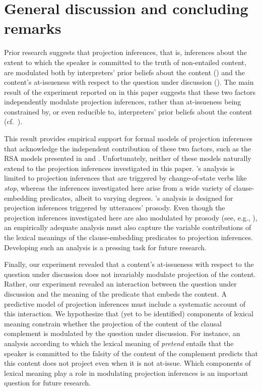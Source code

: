 \documentclass[11pt,fleqn]{article}
\newcommand{\6}{\mbox{$[\hspace*{-.6mm}[$}}
\newcommand{\9}{\mbox{$]\hspace*{-.6mm}]$}}
\newcommand{\citepos}[1]{\citeauthor{#1}'s \citeyear{#1}}
\begin{document}
\section{General discussion and concluding remarks}\label{s-disc}

Prior research suggests that projection inferences, that is, inferences about the extent to which the speaker is committed to the truth of non-entailed content, are modulated both by interpreters' prior beliefs about the content (\citealt{degen-tonhauser-openmind}) and the content's at-issueness with respect to the question under discussion (\citealt{tbd-variability}). The main result of the experiment reported on in this paper suggests that these two factors independently modulate projection inferences, rather than at-issueness being constrained by, or even reducible to, interpreters' prior beliefs about the content (cf.\ \citealt{tonhauser-etal-eval}). 

This result provides empirical support for formal models of projection inferences that acknowledge the independent contribution of these two factors, such as the RSA models presented in \citealt{qing-etal2016} and \citealt{stevens-etal2017}. Unfortunately, neither of these models naturally extend to the projection inferences investigated in this paper. \citepos{qing-etal2016} analysis is limited to projection inferences that are triggered by change-of-state verbs like \emph{stop}, whereas the inferences investigated here arise from a wide variety of clause-embedding predicates, albeit to varying degrees. \citepos{stevens-etal2017} analysis is designed for projection inferences triggered by utterances' prosody. Even though the projection inferences investigated here are also modulated by prosody (see, e.g., \citealt{tonhauser-salt26,djaerv-bacovcin-salt27}), an empirically adequate analysis must also capture the variable contributions of the lexical meanings of the clause-embedding predicates to projection inferences. Developing such an analysis is a pressing task for future research.

Finally, our experiment revealed that a content's at-issueness with respect to the question under discussion does not invariably modulate projection of the content. Rather, our experiment revealed an interaction between the question under discussion and the meaning of the predicate that embeds the content. A predictive model of projection inferences must include a systematic account of this interaction. We hypothesize that (yet to be identified) components of lexical meaning constrain whether the projection of the content of the clausal complement is modulated by the question under discussion. For instance, an analysis according to which the lexical meaning of {\em pretend} entails that the speaker is committed to the falsity of the content of the complement predicts that this content does not project even when it is not at-issue. %
Which components of lexical meaning play a role in modulating projection inferences is an important question for future research. 
\end{document}
